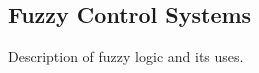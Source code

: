 \subsection{Fuzzy Control Systems}

Description of fuzzy logic and its uses.

\cite{fuzzy_control_introduction}




